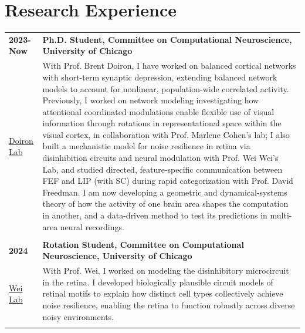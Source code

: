 \documentclass[10pt,letterpaper]{article}
\begin{document}
\section{Research Experience}
\begin{xltabular}{\textwidth}{@{}l X@{}}

\textbf{2023-Now} & \textbf{Ph.D. Student, Committee on Computational Neuroscience, University of Chicago} \\
 \href{https://brainmath.bsd.uchicago.edu/}{Doiron Lab} & With Prof. Brent Doiron, I have worked on balanced cortical networks with short-term synaptic depression, extending balanced network models to account for nonlinear, population-wide correlated activity. Previously, I worked on network modeling investigating how attentional coordinated modulations enable flexible use of visual information through rotations in representational space within the visual cortex, in collaboration with Prof. Marlene Cohen's lab; I also built a mechanistic model for noise resilience in retina via disinhibition circuits and neural modulation with Prof. Wei Wei's Lab, and studied directed, feature-specific communication between FEF and LIP (with SC) during rapid categorization with Prof. David Freedman. I am now developing a geometric and dynamical-systems theory of how the activity of one brain area shapes the computation in another, and a data-driven method to test its predictions in multi-area neural recordings. %

\\
\\

\textbf{2024} & \textbf{Rotation Student, Committee on Computational Neuroscience, University of Chicago} \\
 \href{https://weilab.uchicago.edu/}{Wei Lab} & With Prof. Wei, I worked on modeling the disinhibitory microcircuit in the retina.   I developed biologically plausible circuit models of retinal motifs to explain how distinct  cell types collectively achieve noise resilience, enabling the retina to function robustly   across diverse noisy environments.

\\
\\


\end{xltabular}
\end{document}
